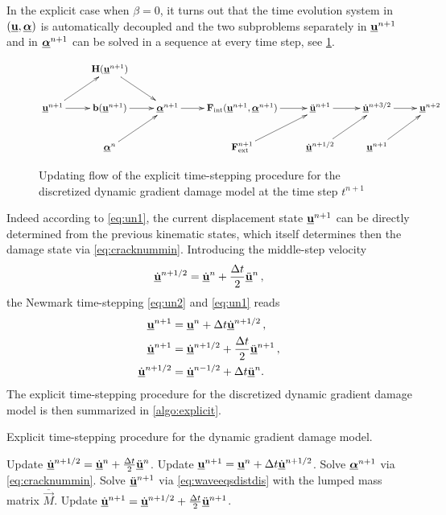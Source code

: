 In the explicit case when $\beta=0$, it turns out that the time evolution system in $(\uvec,\dvec)$ is automatically decoupled and the two subproblems separately in $\uvec^{n+1}$ and in $\dvec^{n+1}$ can be solved in a sequence at every time step, see \cref{fig:updatestate}.
\begin{figure}[htbp]
\normalsize
\centering
\[
\xymatrix{ & \vec{H}(\uvec^{n+1}) \ar[dr] & & & & & \\
\uvec^{n+1} \ar[ur] \ar[r] & \vec{b}(\uvec^{n+1}) \ar[r] & \dvec^{n+1} \ar[r] & \vec{F}_\mathrm{int}(\uvec^{n+1},\dvec^{n+1}) \ar[r] & \ddot{\uvec}^{n+1} \ar[r] & \dot{\uvec}^{n+3/2} \ar[r] & \uvec^{n+2} \\
& \dvec^n \ar[ur] & & \vec{F}_\mathrm{ext}^{n+1} \ar[ur] & \dot{\uvec}^{n+1/2} \ar[ur] & \uvec^{n+1} \ar[ur] &}
\]
\caption{Updating flow of the explicit time-stepping procedure for the discretized dynamic gradient damage model at the time step $t^{n+1}$}
\label{fig:updatestate}
\end{figure}
Indeed according to \eqref{eq:un1}, the current displacement state $\uvec^{n+1}$ can be directly determined from the previous kinematic states, which itself determines then the damage state via \eqref{eq:cracknummin}. Introducing the middle-step velocity
\[
\dot{\uvec}^{n+1/2}=\dot{\uvec}^n+\frac{\Delta t}{2}\ddot{\uvec}^n\,,
\]
the Newmark time-stepping \eqref{eq:un2} and \eqref{eq:un1} reads
\begin{align*}
\uvec^{n+1} &= \uvec^n+\Delta t\dot{\uvec}^{n+1/2}\,, \\
\dot{\uvec}^{n+1} &= \dot{\uvec}^{n+1/2}+\frac{\Delta t}{2}\ddot{\uvec}^{n+1}\,, \\
\dot{\uvec}^{n+1/2} &= \dot{\uvec}^{n-1/2}+\Delta t\ddot{\uvec}^{n}.
\end{align*}
The explicit time-stepping procedure for the discretized dynamic gradient damage model is then summarized in \cref{algo:explicit}.
\begin{algorithm*}[htbp]
\caption{Explicit time-stepping procedure for the dynamic gradient damage model.} \label{algo:explicit}
\begin{algorithmic}[1]\linespread{1.2}\selectfont\normalsize
{}
  \State Update $\dot{\uvec}^{n+1/2}=\dot{\uvec}^{n}+\frac{\Delta t}{2}\ddot{\uvec}^n$.
  \State Update $\uvec^{n+1}=\uvec^n+\Delta t\dot{\uvec}^{n+1/2}$.
  \State Solve $\dvec^{n+1}$ via \eqref{eq:cracknummin}.
  \State Solve $\ddot{\uvec}^{n+1}$ via \eqref{eq:waveeqsdistdis} with the lumped mass matrix $\overline{\vec{M}}$.
  \State Update $\dot{\uvec}^{n+1}=\dot{\uvec}^{n+1/2}+\frac{\Delta t}{2}\ddot{\uvec}^{n+1}$.
\EndFor
\end{algorithmic}
\end{algorithm*}

